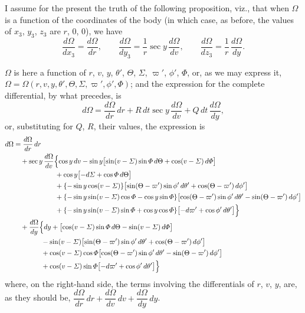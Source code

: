 \documentclass[12pt,a4paper]{article}
\theoremstyle{plain}
\begin{document}
\medskip
I assume for the present the truth of the following proposition, viz., that when $\Omega$ is a function of the coordinates of the body (in which case, as before, the values of $x_{3}$, $y_{3}$, $z_{3}$ are $r$, $0$, $0$), we have
\[
\dfrac{d\Omega}{dx_{3}}=\dfrac{d\Omega}{dr},\qquad
\dfrac{d\Omega}{dy_{3}}=\dfrac{1}{r}\sec y\,\dfrac{d\Omega}{dv},\qquad
\dfrac{d\Omega}{dz_{3}}=\dfrac{1}{r}\,\dfrac{d\Omega}{dy}.
\]

\newpage
{} $\Omega$ is here a function of $r$, $v$, $y$, $\theta'$, $\Theta$, $\varSigma$, $\varpi'$, $\phi'$, $\varPhi$, or, as we may express it, $\Omega=\Omega(r,v,y,\theta',\Theta,\varSigma,\varpi',\phi',\varPhi)$; and the expression for the complete differential, by what precedes, is
\[
d\Omega=\dfrac{d\Omega}{dr}\,dr+R\,dt\sec y\,\dfrac{d\Omega}{dv}+Q\,dt\,\dfrac{d\Omega}{dy},
\]
or, substituting for $Q$, $R$, their values, the expression is
\begin{align*}
d\Omega &= \dfrac{d\Omega}{dr}\,dr\\
&\quad +\sec y\,\dfrac{d\Omega}{dv}\Bigl\{\cos y\,dv-\sin y\bigl[\sin(v-\varSigma)\sin\varPhi\,d\Theta+\cos(v-\varSigma)\,d\varPhi\bigr]\\
&\hspace{6em}+\cos y\bigl[-d\varSigma+\cos\varPhi\,d\Theta\bigr]\\
&\hspace{6em}+\{-\sin y\cos(v-\varSigma)\}\bigl[\sin(\Theta-\varpi')\sin\phi'\,d\theta'+\cos(\Theta-\varpi')\,d\phi'\bigr]\\
&\hspace{6em}+\{-\sin y\sin(v-\varSigma)\cos\varPhi-\cos y\sin\varPhi\}\bigl[\cos(\Theta-\varpi')\sin\phi'\,d\theta'-\sin(\Theta-\varpi')\,d\phi'\bigr]\\
&\hspace{6em}+\{-\sin y\sin(v-\varSigma)\sin\varPhi+\cos y\cos\varPhi\}\bigl[-d\varpi'+\cos\phi'\,d\theta'\bigr]\Bigr\}\\
&\quad +\dfrac{d\Omega}{dy}\Bigl\{dy+\bigl[\cos(v-\varSigma)\sin\varPhi\,d\Theta-\sin(v-\varSigma)\,d\varPhi\bigr]\\
&\hspace{4em}-\sin(v-\varSigma)\bigl[\sin(\Theta-\varpi')\sin\phi'\,d\theta'+\cos(\Theta-\varpi')\,d\phi'\bigr]\\
&\hspace{4em}+\cos(v-\varSigma)\cos\varPhi\bigl[\cos(\Theta-\varpi')\sin\phi'\,d\theta'-\sin(\Theta-\varpi')\,d\phi'\bigr]\\
&\hspace{4em}+\cos(v-\varSigma)\sin\varPhi\bigl[-d\varpi'+\cos\phi'\,d\theta'\bigr]\Bigr\}
\end{align*}
where, on the right-hand side, the terms involving the differentials of $r$, $v$, $y$, are, as they should be, $\dfrac{d\Omega}{dr}\,dr+\dfrac{d\Omega}{dv}\,dv+\dfrac{d\Omega}{dy}\,dy$.
\end{document}
